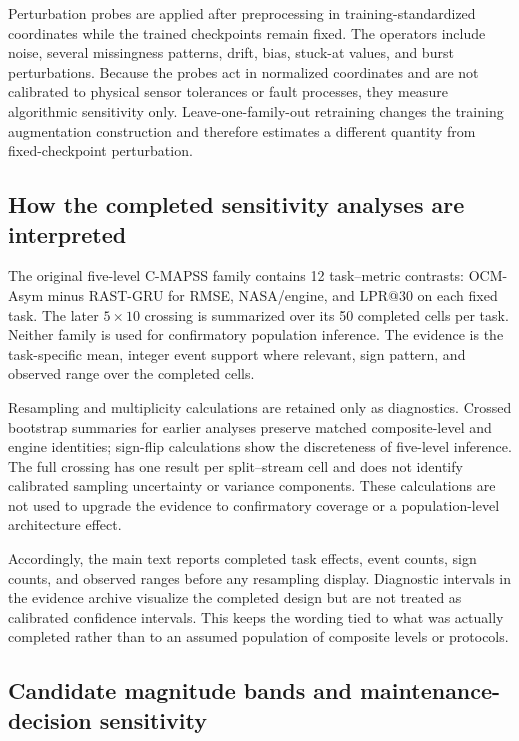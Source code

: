 \documentclass[preprint,12pt,numbers,sort&compress]{elsarticle}
\begin{document}
Perturbation probes are applied after preprocessing in training-standardized coordinates while the trained checkpoints remain fixed. The operators include noise, several missingness patterns, drift, bias, stuck-at values, and burst perturbations. Because the probes act in normalized coordinates and are not calibrated to physical sensor tolerances or fault processes, they measure algorithmic sensitivity only. Leave-one-family-out retraining changes the training augmentation construction and therefore estimates a different quantity from fixed-checkpoint perturbation.

\subsection{How the completed sensitivity analyses are interpreted}

The original five-level C-MAPSS family contains 12 task--metric contrasts: OCM-Asym minus RAST-GRU for RMSE, NASA/engine, and LPR@30 on each fixed task. The later $5\times10$ crossing is summarized over its 50 completed cells per task. Neither family is used for confirmatory population inference. The evidence is the task-specific mean, integer event support where relevant, sign pattern, and observed range over the completed cells.

Resampling and multiplicity calculations are retained only as diagnostics. Crossed bootstrap summaries for earlier analyses preserve matched composite-level and engine identities; sign-flip calculations show the discreteness of five-level inference. The full crossing has one result per split--stream cell and does not identify calibrated sampling uncertainty or variance components. These calculations are not used to upgrade the evidence to confirmatory coverage or a population-level architecture effect.

Accordingly, the main text reports completed task effects, event counts, sign counts, and observed ranges before any resampling display. Diagnostic intervals in the evidence archive visualize the completed design but are not treated as calibrated confidence intervals. This keeps the wording tied to what was actually completed rather than to an assumed population of composite levels or protocols.

\subsection{Candidate magnitude bands and maintenance-decision sensitivity}
\end{document}
